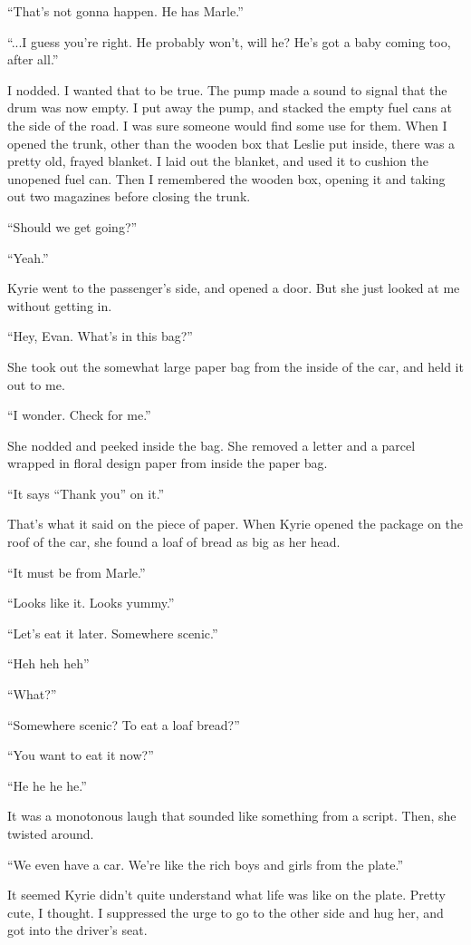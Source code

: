 \documentclass[oneside]{book}
\begin{document}
“That’s not gonna happen. He has Marle.”

“...I guess you’re right. He probably won’t, will he? He’s got a baby coming too, after all.”

I nodded. I wanted that to be true. The pump made a sound to signal that the drum was now empty. I put away the pump, and stacked the empty fuel cans at the side of the road. I was sure someone would find some use for them. When I opened the trunk, other than the wooden box that Leslie put inside, there was a pretty old, frayed blanket. I laid out the blanket, and used it to cushion the unopened fuel can. Then I remembered the wooden box, opening it and taking out two magazines before closing the trunk.

“Should we get going?”

“Yeah.”

Kyrie went to the passenger’s side, and opened a door. But she just looked at me without getting in.

“Hey, Evan. What’s in this bag?”

She took out the somewhat large paper bag from the inside of the car, and held it out to me.

“I wonder. Check for me.”

She nodded and peeked inside the bag. She removed a letter and a parcel wrapped in floral design paper from inside the paper bag.

“It says “Thank you” on it.”

That’s what it said on the piece of paper. When Kyrie opened the package on the roof of the car, she found a loaf of bread as big as her head.

“It must be from Marle.”

“Looks like it. Looks yummy.”

“Let’s eat it later. Somewhere scenic.”

“Heh heh heh”

“What?”

“Somewhere scenic? To eat a loaf bread?”

“You want to eat it now?”

“He he he he.”

It was a monotonous laugh that sounded like something from a script. Then, she twisted around.

“We even have a car. We’re like the rich boys and girls from the plate.”

It seemed Kyrie didn’t quite understand what life was like on the plate. Pretty cute, I thought. I suppressed the urge to go to the other side and hug her, and got into the driver’s seat.
\end{document}
